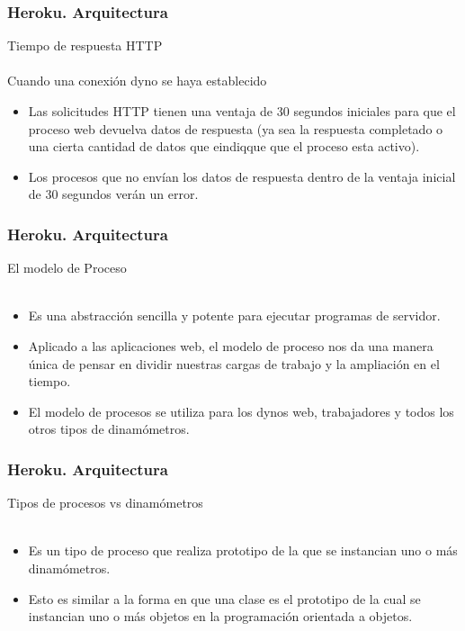 \documentclass{beamer}
\begin{document}
\begin{frame}
\frametitle{Heroku. Arquitectura}
\centering Tiempo de respuesta HTTP\\ \ \\
\flushleft Cuando una conexión dyno se haya establecido
\begin{itemize}
	\item Las solicitudes HTTP tienen una ventaja de 30 segundos iniciales para que el proceso web devuelva datos de respuesta (ya sea la respuesta completado o una cierta cantidad de datos que eindiqque que el proceso esta activo). 
	\item Los procesos que no envían los datos de respuesta dentro de la ventaja inicial de 30 segundos verán un error.
\end{itemize}
\end{frame}

\begin{frame}
	\frametitle{Heroku. Arquitectura}
	\centering El modelo de Proceso\\ \ \\
\begin{itemize}
	\item Es una abstracción sencilla y potente para ejecutar programas de servidor. 
	\item Aplicado a las aplicaciones web, el modelo de proceso nos da una manera única de pensar en dividir nuestras cargas de trabajo y la ampliación en el tiempo.
	\item El modelo de procesos se utiliza para los dynos web, trabajadores y todos los otros tipos de dinamómetros.
\end{itemize}
\end{frame}

\begin{frame}
	\frametitle{Heroku. Arquitectura}
	\centering Tipos de procesos vs dinamómetros\\ \ \\
	\begin{itemize}
		\item Es un tipo de proceso que realiza prototipo de la que se instancian uno o más dinamómetros.
		\item Esto es similar a la forma en que una clase es el prototipo de la cual se instancian uno o más objetos en la programación orientada a objetos.\\
	\end{itemize}
\end{frame}
\end{document}
